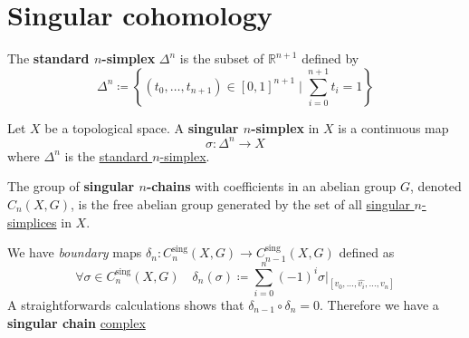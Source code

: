 \documentclass[../../main]{subfiles}
\begin{document}
\chapter{Singular cohomology}

\begin{definition}\label{def:standard-simplex}
  The \textbf{standard \(n\)-simplex} \(\Delta^{n}\) is the subset of \(\mathbb{R}^{n+1}\) defined by
  \begin{equation*}
    \Delta^{n} \coloneq \left\{ (t_{0}, \ldots, t_{n+1}) \in [0, 1]^{n+1} \mid \sum_{i=0}^{n+1} t_{i} = 1 \right\}
  \end{equation*}
\end{definition}

\begin{definition}[Simplex]\label{def:simplex}
  Let \(X\) be a topological space.
  A \textbf{singular \(n\)-simplex} in \(X\) is a continuous map
  \begin{equation*}
    \sigma: \Delta^{n} \to X
  \end{equation*}
  where \(\Delta^{n}\) is the \hyperref[def:standard-simplex]{standard \(n\)-simplex}.
\end{definition}


\begin{definition}\label{def:singular-chain}
  The group of \textbf{singular \(n\)-chains} with coefficients in an abelian group \(G\), denoted \(C_{n}(X, G)\), is the free abelian group generated by the set of all \hyperref[def:simplex]{singular \(n\)-simplices} in \(X\).

  We have \textit{boundary} maps \(\delta_{n}: C_{n}^{\operatorname{sing}}(X, G) \to C_{n-1}^{\operatorname{sing}}(X, G)\) defined as
  \begin{equation*}
    \forall \sigma \in C_{n}^{\operatorname{sing}}(X, G) \quad \delta_{n}(\sigma) \coloneq \sum_{i=0}^{n} (-1)^{i} \sigma|_{[v_{0}, \ldots, \hat{v_{i}}, \ldots, v_{n}]}
  \end{equation*}
  A straightforwards calculations shows that \(\delta_{n-1} \circ \delta_{n} = 0\).
  Therefore we have a \textbf{singular chain} \hyperref[def:complex]{complex}
  \begin{center}
  \end{center}
\end{definition}
\end{document}
